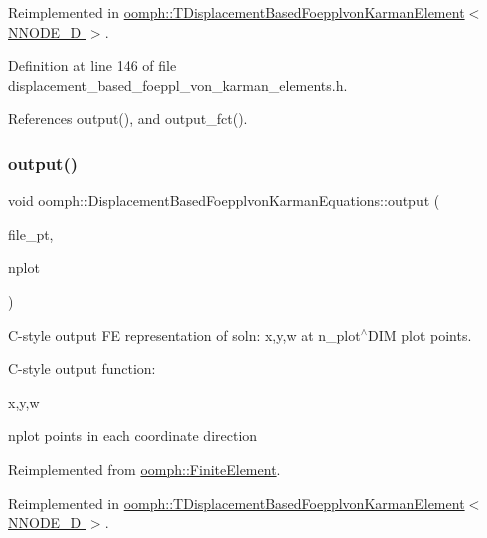 Reimplemented in \hyperlink{classoomph_1_1TDisplacementBasedFoepplvonKarmanElement_a5558c5bd6365deda6a93d6eae19f22d0}{oomph\+::\+T\+Displacement\+Based\+Foepplvon\+Karman\+Element$<$ N\+N\+O\+D\+E\+\_\+D $>$}.



Definition at line 146 of file displacement\+\_\+based\+\_\+foeppl\+\_\+von\+\_\+karman\+\_\+elements.\+h.



References output(), and output\+\_\+fct().

\mbox{\label{classoomph_1_1DisplacementBasedFoepplvonKarmanEquations_ad5c7fa0d55e2eb85d1f305b05be86a97}} 
\subsubsection{\texorpdfstring{output()}{output()}\hspace{0.1cm}{\footnotesize\ttfamily [4/4]}}
{\footnotesize\ttfamily void oomph\+::\+Displacement\+Based\+Foepplvon\+Karman\+Equations\+::output (\begin{DoxyParamCaption}\item[{F\+I\+LE $\ast$}]{file\+\_\+pt,  }\item[{const unsigned \&}]{nplot }\end{DoxyParamCaption})\hspace{0.3cm}{\ttfamily [virtual]}}



C-\/style output FE representation of soln\+: x,y,w at n\+\_\+plot$^\wedge$\+D\+IM plot points. 

C-\/style output function\+:

x,y,w

nplot points in each coordinate direction 

Reimplemented from \hyperlink{classoomph_1_1FiniteElement_adfaee690bb0608f03320eeb9d110d48c}{oomph\+::\+Finite\+Element}.



Reimplemented in \hyperlink{classoomph_1_1TDisplacementBasedFoepplvonKarmanElement_a18dfb77359aae414020e12c4025534ab}{oomph\+::\+T\+Displacement\+Based\+Foepplvon\+Karman\+Element$<$ N\+N\+O\+D\+E\+\_\+D $>$}.



